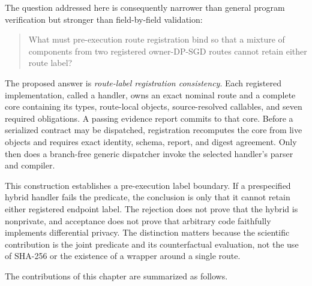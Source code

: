 The question addressed here is consequently narrower than general program
verification but stronger than field-by-field validation:

\begin{quote}
What must pre-execution route registration bind so that a mixture of components
from two registered owner-DP-SGD routes cannot retain either route label?
\end{quote}

The proposed answer is \emph{route-label registration consistency}.  Each
registered implementation, called a handler, owns an exact nominal route and a
complete core containing its types, route-local objects, source-resolved callables,
and seven required obligations.  A passing evidence report commits to that core.
Before a serialized contract may be dispatched, registration recomputes the core
from live objects and requires exact identity, schema, report, and digest
agreement.  Only then does a branch-free generic dispatcher invoke the selected
handler's parser and compiler.

This construction establishes a pre-execution label boundary.  If a prespecified
hybrid handler fails the predicate, the conclusion is only that it cannot retain
either registered endpoint label.  The rejection does not prove that the hybrid
is nonprivate, and acceptance does not prove that arbitrary code faithfully
implements differential privacy.  The distinction matters because the scientific
contribution is the joint predicate and its counterfactual evaluation, not the use
of SHA-256 or the existence of a wrapper around a single route.

The contributions of this chapter are summarized as follows.

